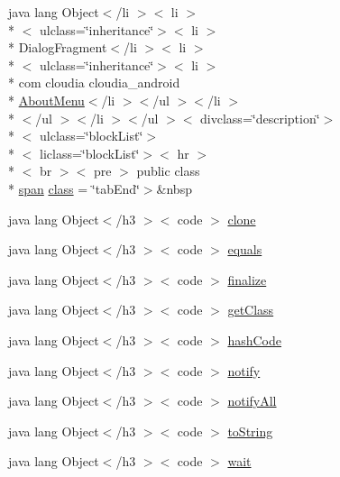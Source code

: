 \begin{DoxyCompactItemize}
 java lang Object$<$/li $>$$<$ li $>$\\*
$<$ ulclass=\char`\"{}inheritance\char`\"{}$>$$<$ li $>$\\*
 Dialog\-Fragment$<$/li $>$$<$ li $>$\\*
$<$ ulclass=\char`\"{}inheritance\char`\"{}$>$$<$ li $>$\\*
 com cloudia cloudia\-\_\-android \\*
\hyperlink{index-1_8html_a162bfbb70b33688ca3d6f9b372dd6e4b}{About\-Menu}$<$/li $>$$<$/ul $>$$<$/li $>$\\*
$<$/ul $>$$<$/li $>$$<$/ul $>$$<$ divclass=\char`\"{}description\char`\"{}$>$\\*
$<$ ulclass=\char`\"{}block\-List\char`\"{}$>$\\*
$<$ liclass=\char`\"{}block\-List\char`\"{}$>$$<$ hr $>$\\*
$<$ br $>$$<$ pre $>$ public class \\*
\hyperlink{stylesheet_8css_a8343996ebcf16220b04e54659aac31cc}{span} \hyperlink{_about_menu_8html_aca81297e9b19a2d3e274a36c182486be}{class} = \char`\"{}tab\-End\char`\"{}$>$\&nbsp
\item 
java lang Object$<$/h3 $>$$<$ code $>$ \hyperlink{_about_menu_8html_adc9607fcabf6f2d7f401ad52015ef6e0}{clone}
\item 
java lang Object$<$/h3 $>$$<$ code $>$ \hyperlink{_about_menu_8html_a8974318cea585f72df717e0380ec7104}{equals}
\item 
java lang Object$<$/h3 $>$$<$ code $>$ \hyperlink{_about_menu_8html_ab2315181ead4aeedef2374039b6ddde7}{finalize}
\item 
java lang Object$<$/h3 $>$$<$ code $>$ \hyperlink{_about_menu_8html_a98e6644727fe65eac217a6855045be43}{get\-Class}
\item 
java lang Object$<$/h3 $>$$<$ code $>$ \hyperlink{_about_menu_8html_a8e178e2bb2bef055ea23ea3910a221ca}{hash\-Code}
\item 
java lang Object$<$/h3 $>$$<$ code $>$ \hyperlink{_about_menu_8html_ae99ae10b5010594dbda4794e02db271b}{notify}
\item 
java lang Object$<$/h3 $>$$<$ code $>$ \hyperlink{_about_menu_8html_a1279357e6e09e33e75b55eb05fdb6436}{notify\-All}
\item 
java lang Object$<$/h3 $>$$<$ code $>$ \hyperlink{_about_menu_8html_a36e8a76a4132c9a7081416f27d087615}{to\-String}
\item 
java lang Object$<$/h3 $>$$<$ code $>$ \hyperlink{_about_menu_8html_a9a9f0c22e5688d478c707f910f1c1aea}{wait}
\end{DoxyCompactItemize}


